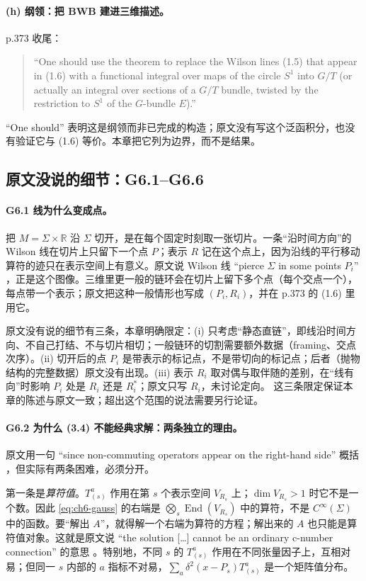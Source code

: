 \paragraph{(h) 纲领：把 BWB 建进三维描述。}p.373 收尾：
\begin{quote}\small
“One should use the theorem to replace the Wilson lines (1.5) that appear in (1.6) with a functional integral over maps of the circle $S^1$ into $G/T$ (or actually an integral over sections of a $G/T$ bundle, twisted by the restriction to $S^1$ of the $G$-bundle $E$).” 
\end{quote}
“One should” 表明这是纲领而非已完成的构造；原文没有写这个泛函积分，也没有验证它与 (1.6) 等价。本章把它列为边界，而不是结果。

\subsection{原文没说的细节：G6.1--G6.6}
\label{sec:ch6-gaps}

\paragraph{G6.1 线为什么变成点。}把 $M=\Sigma\times\mathbb R$ 沿 $\Sigma$ 切开，是在每个固定时刻取一张切片。一条“沿时间方向”的 Wilson 线在切片上只留下一个点 $P$；表示 $R$ 记在这个点上，因为沿线的平行移动算符的迹只在表示空间上有意义。原文说 Wilson 线 “pierce $\Sigma$ in some points $P_i$” ，正是这个图像。三维里更一般的链环会在切片上留下多个点（每个交点一个），每点带一个表示；原文把这种一般情形也写成 $(P_i,R_i)$，并在 p.373 的 (1.6) 里用它。

原文没有说的细节有三条，本章明确限定：(i) 只考虑“静态直链”，即线沿时间方向、不自己打结、不与切片相切；一般链环的切割需要额外数据（framing、交点次序）。(ii) 切开后的点 $P_i$ 是带表示的标记点，不是带切向的标记点；后者（抛物结构的完整数据）原文没有出现。(iii) 表示 $R_i$ 取对偶与取伴随的差别，在“线有向”时影响 $P_i$ 处是 $R_i$ 还是 $R_i^*$；原文只写 $R_i$，未讨论定向。\ours{} 这三条限定保证本章的陈述与原文一致；超出这个范围的说法需要另行论证。

\paragraph{G6.2 为什么 (3.4) 不能经典求解：两条独立的理由。}原文用一句 “since non-commuting operators appear on the right-hand side” 概括 ，但实际有两条困难，必须分开。

第一条是\emph{算符值}。$T^a_{(s)}$ 作用在第 $s$ 个表示空间 $V_{R_s}$ 上；$\dim V_{R_s}>1$ 时它不是一个数。因此 \eqref{eq:ch6-gauss} 的右端是 $\bigotimes_s\operatorname{End}(V_{R_s})$ 中的算符，不是 $C^\infty(\Sigma)$ 中的函数。要“解出 $A$”，就得解一个右端为算符的方程；解出来的 $A$ 也只能是算符值对象。这就是原文说 “the solution [\dots] cannot be an ordinary c-number connection” 的意思 。特别地，不同 $s$ 的 $T^a_{(s)}$ 作用在不同张量因子上，互相对易；但同一 $s$ 内部的 $a$ 指标不对易，$\sum_a\delta^2(x-P_s)T^a_{(s)}$ 是一个矩阵值分布。

